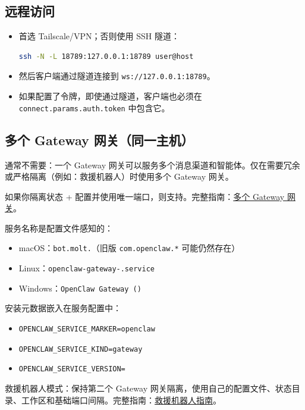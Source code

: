\subsection{远程访问}


\begin{itemize}
  \item 首选 Tailscale/VPN；否则使用 SSH 隧道：
\begin{lstlisting}[language=bash]
  ssh -N -L 18789:127.0.0.1:18789 user@host
\end{lstlisting}

  \item 然后客户端通过隧道连接到 \texttt{ws://127.0.0.1:18789}。
  \item 如果配置了令牌，即使通过隧道，客户端也必须在 \texttt{connect.params.auth.token} 中包含它。
\end{itemize}


\subsection{多个 Gateway 网关（同一主机）}


通常不需要：一个 Gateway 网关可以服务多个消息渠道和智能体。仅在需要冗余或严格隔离（例如：救援机器人）时使用多个 Gateway 网关。

如果你隔离状态 + 配置并使用唯一端口，则支持。完整指南：\href{/gateway/multiple-gateways}{多个 Gateway 网关}。

服务名称是配置文件感知的：

\begin{itemize}
  \item macOS：\texttt{bot.molt.}（旧版 \texttt{com.openclaw.*} 可能仍然存在）
  \item Linux：\texttt{openclaw-gateway-.service}
  \item Windows：\texttt{OpenClaw Gateway ()}
\end{itemize}


安装元数据嵌入在服务配置中：

\begin{itemize}
  \item \texttt{OPENCLAW\_SERVICE\_MARKER=openclaw}
  \item \texttt{OPENCLAW\_SERVICE\_KIND=gateway}
  \item \texttt{OPENCLAW\_SERVICE\_VERSION=}
\end{itemize}


救援机器人模式：保持第二个 Gateway 网关隔离，使用自己的配置文件、状态目录、工作区和基础端口间隔。完整指南：\href{/gateway/multiple-gateways\#rescue-bot-guide}{救援机器人指南}。

